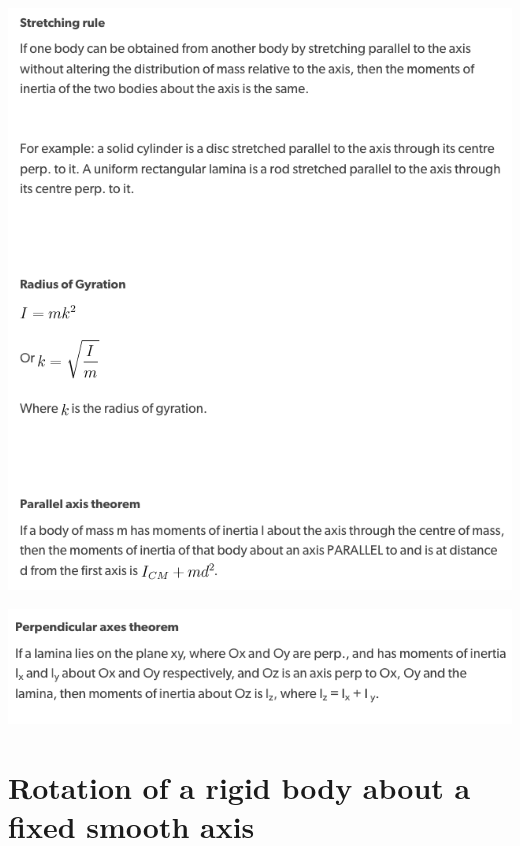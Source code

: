 \documentclass[a4paper]{article}
\begin{document}
\begin{center}
    \includegraphics[scale=0.5]{img_M/23_eg6}
\end{center}
\begin{center}
    \includegraphics[scale=0.5]{img_M/23_eg7}
\end{center}


\section{Rotation of a rigid body about a fixed smooth axis}
\end{document}
